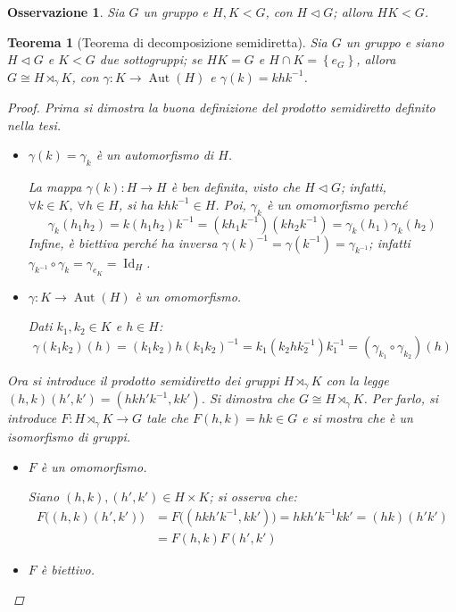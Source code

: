 \documentclass[11pt]{scrartcl}
\theoremstyle{style1}
\newtheorem{osservazione}{Osservazione}[section]
\newtheorem{teorema}{Teorema}[section]
\numberwithin{equation}{subsection}
\begin{document}
\begin{osservazione}
	Sia $G$ un gruppo e $H,K < G$, con $H \lhd G$; allora $HK < G$.
\end{osservazione}
\begin{teorema}
	[Teorema di decomposizione semidiretta]\label{scth}
	Sia $G$ un gruppo e siano $H \lhd G$ e $K < G$ due sottogruppi; se $HK = G$ e $H \cap K = \left\{ e_G \right\} $, allora $G \cong H \rtimes _\gamma K$, con $\gamma: K \to \operatorname{Aut} (H)$ e $\gamma(k) = k hk^{-1}$.
	\begin{proof}
		Prima si dimostra la buona definizione del prodotto semidiretto definito nella tesi.
		\begin{itemize}
			\item $\gamma(k)=\gamma_k$ \`e un automorfismo di $H$.

				La mappa $\gamma(k):H\to H$ \`e ben definita, visto che $H\lhd G$; infatti, $\forall k \in  K, \ \forall h \in H$, si ha $k h k^{-1}\in H$.
				Poi, $\gamma_k$ \`e un omomorfismo perch\'e
				\[
				\gamma_k (h_1h_2) = k (h_1h_2) k^{-1} = (kh_1k^{-1})(k h_2k^{-1}) = \gamma_k(h_1) \gamma_k(h_2)
				\] 
				Infine, \`e biettiva perch\'e ha inversa $\gamma(k)^{-1} =\gamma(k^{-1})= \gamma_{k^{-1}} $; infatti $\gamma_{k^{-1}} \circ \gamma_k = \gamma_{e_K}  = \operatorname{Id} _H$.
			\item $\gamma : K \to \operatorname{Aut} (H)$ \`e un omomorfismo.

				Dati $k_1,k_2 \in K$ e $h \in H$:
\[
\gamma(k_1k_2)(h) = (k_1k_2)h(k_1k_2)^{-1} = k_1(k_2hk_2^{-1})k_1^{-1}= (\gamma_{k_1} \circ \gamma_{k_2} )(h)
\] 
		\end{itemize}
		Ora si introduce il prodotto semidiretto dei gruppi $H \rtimes _\gamma K$ con la legge $(h,k)(h',k') = (hkh'k^{-1},k k')$.
		Si dimostra che $G \cong H \rtimes _\gamma K$.
		Per farlo, si introduce $F : H \rtimes _\gamma K \to G$ tale che $F(h,k) = hk \in G$ e si mostra che \`e un isomorfismo di gruppi.
		\begin{itemize}
			\item $F$ \`e un omomorfismo.

				Siano $(h,k), (h',k') \in H \times K$; si osserva che:
				\[
					\begin{split}
						F\big((h,k)(h',k')\big) &= F\big((hkh'k^{-1},k k')\big) = hkh'k^{-1} k k'= (hk)(h'k')\\
									&= F(h,k) F(h',k')
					\end{split}
				\] 
			\item $F$ \`e biettivo.


\end{itemize}
\end{proof}
\end{teorema}
\end{document}
